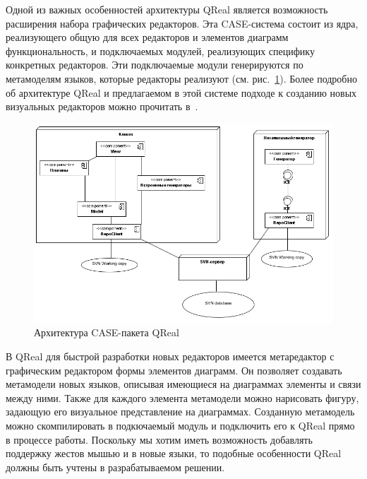 \documentclass[a5paper]{article}
\begin{document}
Одной из важных особенностей архитектуры QReal является возможность расширения набора графических редакторов. Эта CASE-система состоит из ядра, реализующего общую для всех редакторов и элементов диаграмм функциональность, и подключаемых модулей, реализующих специфику конкретных редакторов. Эти подключаемые модули генерируются по метамоделям языков, которые редакторы реализуют (см. рис.~\ref{architecture}). Более подробно об архитектуре QReal и предлагаемом в этой системе подходе к  созданию новых визуальных редакторов можно прочитать в~\cite{qreal}. 

\begin{figure} [ht]
  \begin{center}
    \includegraphics[width=1\textwidth, bb=0 0 798 531]{01-architecture.png}
    \caption{Архитектура CASE-пакета QReal}
    \label{architecture}
  \end{center}
\end{figure}

В QReal для быстрой разработки новых редакторов имеется метаредактор с графическим редактором формы элементов диаграмм. Он позволяет создавать метамодели новых языков, описывая имеющиеся на диаграммах элементы и связи между ними. Также для каждого элемента метамодели можно нарисовать фигуру, задающую его визуальное представление на диаграммах. Созданную метамодель можно скомпилировать в подкючаемый модуль и подключить его к QReal прямо в процессе работы. Поскольку мы хотим иметь возможность добавлять поддержку  жестов мышью и в новые языки, то подобные особенности QReal должны быть учтены в разрабатываемом решении. 
\end{document}
